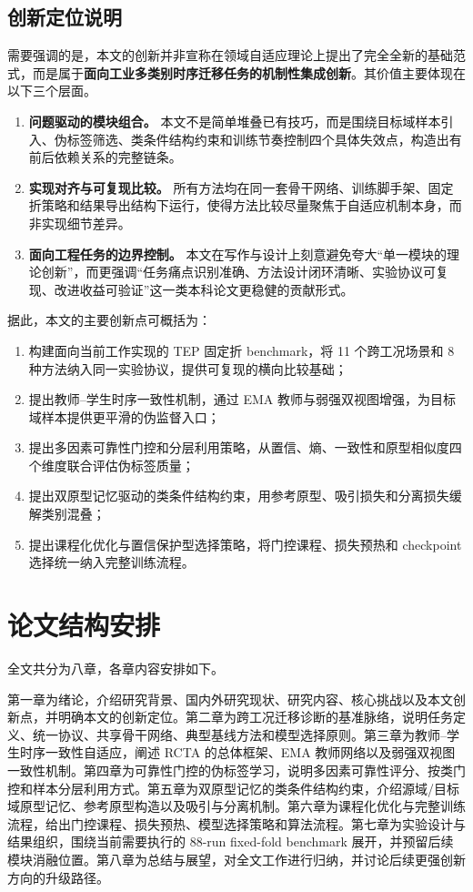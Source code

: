 \subsection{创新定位说明}
需要强调的是，本文的创新并非宣称在领域自适应理论上提出了完全全新的基础范式，而是属于\textbf{面向工业多类别时序迁移任务的机制性集成创新}。其价值主要体现在以下三个层面。

\begin{enumerate}
\item \textbf{问题驱动的模块组合。} 本文不是简单堆叠已有技巧，而是围绕目标域样本引入、伪标签筛选、类条件结构约束和训练节奏控制四个具体失效点，构造出有前后依赖关系的完整链条。
\item \textbf{实现对齐与可复现比较。} 所有方法均在同一套骨干网络、训练脚手架、固定折策略和结果导出结构下运行，使得方法比较尽量聚焦于自适应机制本身，而非实现细节差异。
\item \textbf{面向工程任务的边界控制。} 本文在写作与设计上刻意避免夸大“单一模块的理论创新”，而更强调“任务痛点识别准确、方法设计闭环清晰、实验协议可复现、改进收益可验证”这一类本科论文更稳健的贡献形式。
\end{enumerate}

据此，本文的主要创新点可概括为：
\begin{enumerate}
\item 构建面向当前工作实现的 TEP 固定折 benchmark，将 11 个跨工况场景和 8 种方法纳入同一实验协议，提供可复现的横向比较基础；
\item 提出教师--学生时序一致性机制，通过 EMA 教师与弱强双视图增强，为目标域样本提供更平滑的伪监督入口；
\item 提出多因素可靠性门控和分层利用策略，从置信、熵、一致性和原型相似度四个维度联合评估伪标签质量；
\item 提出双原型记忆驱动的类条件结构约束，用参考原型、吸引损失和分离损失缓解类别混叠；
\item 提出课程化优化与置信保护型选择策略，将门控课程、损失预热和 checkpoint 选择统一纳入完整训练流程。
\end{enumerate}

\section{论文结构安排}
全文共分为八章，各章内容安排如下。

第一章为绪论，介绍研究背景、国内外研究现状、研究内容、核心挑战以及本文创新点，并明确本文的创新定位。第二章为跨工况迁移诊断的基准脉络，说明任务定义、统一协议、共享骨干网络、典型基线方法和模型选择原则。第三章为教师--学生时序一致性自适应，阐述 RCTA 的总体框架、EMA 教师网络以及弱强双视图一致性机制。第四章为可靠性门控的伪标签学习，说明多因素可靠性评分、按类门控和样本分层利用方式。第五章为双原型记忆的类条件结构约束，介绍源域/目标域原型记忆、参考原型构造以及吸引与分离机制。第六章为课程化优化与完整训练流程，给出门控课程、损失预热、模型选择策略和算法流程。第七章为实验设计与结果组织，围绕当前需要执行的 88-run fixed-fold benchmark 展开，并预留后续模块消融位置。第八章为总结与展望，对全文工作进行归纳，并讨论后续更强创新方向的升级路径。

